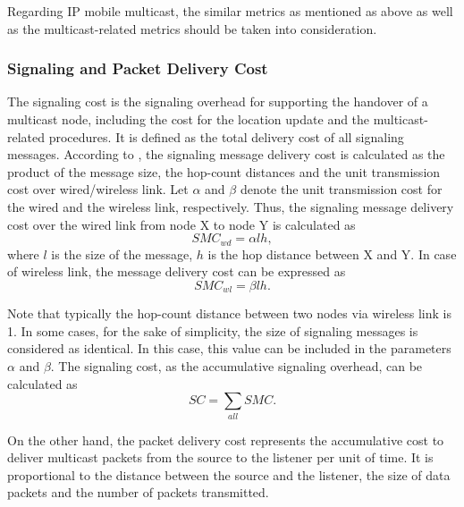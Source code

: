 Regarding IP mobile multicast, the similar metrics as mentioned as above as well as the multicast-related metrics should be taken into consideration. 
\subsubsection{Signaling and Packet Delivery Cost}
The signaling cost is the signaling overhead for supporting the handover of a multicast node, including the cost for the location update and the multicast-related procedures. It is defined as the total delivery cost of all signaling messages. According to \cite{RO_PMIPv6_Lee}, the signaling message delivery cost is calculated as the product of the message size, the hop-count distances and the unit transmission cost over wired/wireless link. Let $\alpha$ and $\beta$ denote the unit transmission cost for the wired and the wireless link, respectively. Thus, the signaling message delivery cost over the wired link from node X to node Y is calculated as\\
\begin{equation}
SMC_{wd} = \alpha l  h,
\end{equation}
where $l$ is the size of the message, $h$ is the hop distance between X and Y. In case of wireless link, the message delivery cost can be expressed as
\begin{equation}
SMC_{wl} = \beta  l h.
\end{equation}

Note that typically the hop-count distance between two nodes via wireless link is 1. In some cases, for the sake of simplicity, the size of signaling messages is considered as identical. In this case, this value can be included in the parameters $\alpha$ and $\beta$. 
The signaling cost, as the accumulative signaling overhead, can be calculated as
\begin{equation}
SC = \sum_{all} SMC.
\end{equation}

On the other hand, the packet delivery cost represents the accumulative cost to deliver multicast packets from the source to the listener per unit of time. It is proportional to the distance between the source and the listener, the size of data packets and the number of packets transmitted. 

